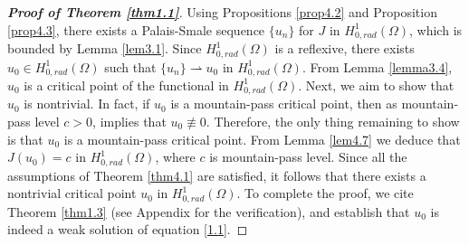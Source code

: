 \documentclass[11pt]{amsart}
\numberwithin{equation}{section}
\newcommand{\hr}{H^1_{0, rad}(\Omega)}
\newcommand{\1}{\frac{1}{2}}
\begin{document}
	\begin{proof}[\bf Proof of Theorem \ref{thm1.1}]
		Using Propositions \ref{prop4.2} and Proposition \ref{prop4.3}, there exists a Palais-Smale sequence $\{u_n\}$ for $J$ in $\hr$, which is bounded by Lemma \ref{lem3.1}. Since $\hr$ is a reflexive, there exists $u_0\in \hr$ such that $\{u_n\}\rightharpoonup u_0$ in $\hr$. From Lemma \ref{lemma3.4}, $u_0$ is a critical point of the functional in $\hr$. Next, we aim to show that $u_0$ is nontrivial. In fact, if $u_0$ is a mountain-pass critical point, then as mountain-pass level $c>0$, implies that $u_0 \not\equiv 0$. Therefore, the only thing remaining to show is that $u_0$ is a mountain-pass critical point. From Lemma \ref{lem4.7} we deduce that $J(u_0)=c$ in $\hr$, where $c$ is mountain-pass level. Since all the assumptions of Theorem \ref{thm4.1} are satisfied, it follows that there exists a nontrivial critical point $u_0$ in $\hr$. To complete the proof, we cite Theorem \ref{thm1.3} (see Appendix for the verification), and establish that $u_0$ is indeed a weak solution of equation \eqref{1.1}.
	\end{proof}
\end{document}
